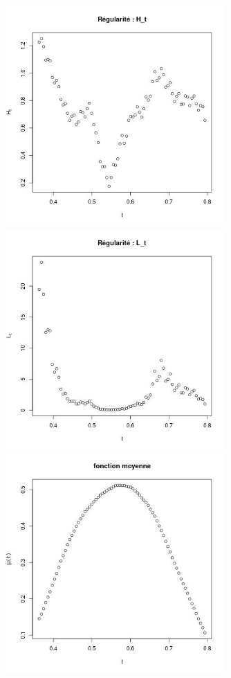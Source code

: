 \begin{figure}[H]
\begin{minipage}{0.48\textwidth}
	\end{minipage}
	\begin{minipage}{0.48\textwidth}
		\includegraphics[width=0.75\textwidth]{Images/pv_estim/ete_187128_Ht.jpg}
		\includegraphics[width=0.75\textwidth]{Images/pv_estim/ete_187128_Lt.jpg}
		\includegraphics[width=0.75\textwidth]{Images/pv_estim/ete_187128_mut.jpg}

\end{minipage}
\end{figure}
